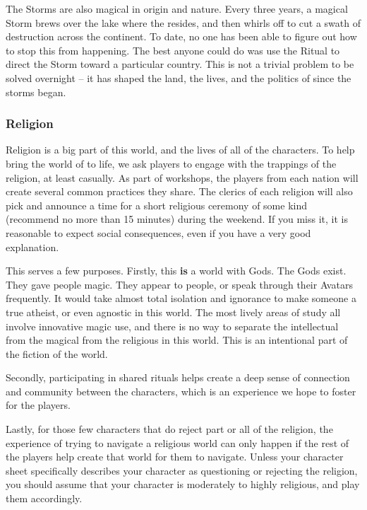 \documentclass[sheet]{PP}
\begin{document}
The Storms are also magical in origin and nature. Every three years, a magical Storm brews over the lake where the \pSc{} resides, and then whirls off to cut a swath of destruction across the continent. To date, no one has been able to figure out how to stop this from happening. The best anyone could do was use the Ritual to direct the Storm toward a particular country. This is not a trivial problem to be solved overnight -- it has shaped the land, the lives, and the politics of \pEarth{} since the storms began.

\subsubsection{Religion}
Religion is a big part of this world, and the lives of all of the characters. To help bring the world of \pEarth{} to life, we ask players to engage with the trappings of the religion, at least casually. As part of workshops, the players from each nation will create several common practices they share. The clerics of each religion will also pick and announce a time for a short religious ceremony of some kind (recommend no more than 15 minutes) during the weekend. If you miss it, it is reasonable to expect social consequences, even if you have a very good explanation.

This serves a few purposes. Firstly, this \textbf{is} a world with Gods. The Gods exist. They gave people magic. They appear to people, or speak through their Avatars frequently. It would take almost total isolation and ignorance to make someone a true atheist, or even agnostic in this world. The most lively areas of study all involve innovative magic use, and there is no way to separate the intellectual from the magical from the religious in this world. This is an intentional part of the fiction of the world. 

Secondly, participating in shared rituals helps create a deep sense of connection and community between the characters, which is an experience we hope to foster for the players. 

Lastly, for those few characters that do reject part or all of the religion, the experience of trying to navigate a religious world can only happen if the rest of the players help create that world for them to navigate. Unless your character sheet specifically describes your character as questioning or rejecting the religion, you should assume that your character is moderately to highly religious, and play them accordingly. 
\end{document}
